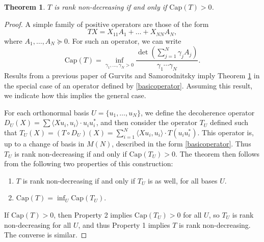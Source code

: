 \documentclass[12pt]{article}
\newtheorem{theorem}{Theorem}
\begin{document}
\begin{theorem} \label{rankdecreasingcapacitytheorem}
    $T$ is rank non-decreasing if and only if $\text{Cap}(T) > 0$.
\end{theorem}
\begin{proof}
    A simple family of positive operators are those of the form
    \begin{equation} \label{basicoperator}
        TX = X_{11} A_1 + \dots + X_{NN} A_N,
    \end{equation}
    where $A_1,\dots,A_N \succeq 0$. For such an operator, we can write
    \[ \text{Cap}(T) = \inf_{\gamma_1, \dots, \gamma_N > 0} \frac{\det ( \sum_{j = 1}^N \gamma_j A_j )}{\gamma_1 \cdots \gamma_N}. \]
    Results from a previous paper of Gurvits and Samorodnitsky \cite{gurvits3} imply Theorem \ref{rankdecreasingcapacitytheorem} in the special case of an operator defined by \eqref{basicoperator}. Assuming this result, we indicate how this implies the general case.

    For each orthonormal basis $U = \{ u_1, \dots, u_N \}$, we define the decoherence operator $D_U(X) = \sum \langle Xu_i, u_i \rangle \cdot u_i u_i^*$, and then consider the operator $T_U$ defined such that $T_U(X) = (T \circ D_U)(X) = \sum_{i=1}^N \langle X u_i, u_i \rangle \cdot T(u_i u_i^*)$.
    This operator is, up to a change of basis in $M(N)$, described in the form \eqref{basicoperator}. Thus $T_U$ is rank non-decreasing if and only if $\text{Cap}(T_U) > 0$. The theorem then follows from the following two properties of this construction:
    \begin{enumerate}
        \item $T$ is rank non-decreasing if and only if $T_U$ is as well, for all bases $U$.
        \item $\text{Cap}(T) = \inf_U \text{Cap}(T_U)$.
    \end{enumerate}
    If $\text{Cap}(T) > 0$, then Property 2 implies $\text{Cap}(T_U) > 0$ for all $U$, so $T_U$ is rank non-decreasing for all $U$, and thus Property 1 implies $T$ is rank non-decreasing. The converse is similar.


\end{proof}
\end{document}
